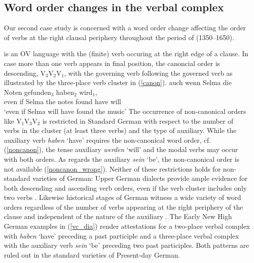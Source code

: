 \documentclass[output=paper
	        ,collection
	        ,collectionchapter
 	        ,biblatex
                ,babelshorthands
                ,newtxmath
                ,draftmode
                ,colorlinks, citecolor=brown
]{./langsci/langscibook}
\begin{document}
\subsection{Word order changes in the verbal complex \label{VC}} 

Our second case study is concerned with a word order change affecting the order of verbs at the right clausal periphery throughout the period of  (1350--1650). 

 is an OV language with the (finite) verb occuring at the right edge of a clause. In case more than one verb appears in final position, the canoncial order is descending, \ie V$_3$V$_2$V$_1$, with the governing verb following the governed verb as illustrated by the three-place verb cluster in (\ref{canon}). 
\ea \label{canon}
\gll auch wenn Selma die Noten gefunden$_3$ haben$_2$ wird$_1$, \\ even if Selma the notes found have will \\
\glt `even if Selma will have found the music'
\z
The occurrence of non-canonical orders like V$_1$V$_3$V$_2$ is restricted in Standard German with respect to the number of verbs in the cluster (at least three verbs) and the type of auxiliary. While the auxiliary verb \textit{haben} `have' requires the non-canonical word order, cf. (\ref{noncanon}), the tense auxiliary \textit{werden} `will' and the modal verbs may occur with both orders. As regards the auxiliary \textit{sein} `be', the non-canonical order is not available (\ref{noncanon_wrong}).  
\eal
{}
\zl
Neither of these restrictions holds for non-standard varieties of German: Upper German dialects provide ample evidence for both descending and ascending verb orders, even if the verb cluster includes only two verbs \citep{dubenion2010}. Likewise historical stages of German witness a wide variety of word orders regardless of the number of verbs appearing at the right periphery of the clause and independent of the nature of the auxiliary \citep{ebert1981,haerd1981,sapp2011}. The Early New High German examples in (\ref{vc_dia}) render attestations for a two-place verbal complex with \textit{haben} `have' preceding a past participle and a three-place verbal complex with the auxiliary verb \textit{sein} `be' preceding two past participles. Both patterns are ruled out in the standard varieties of Present-day German.
\end{document}
